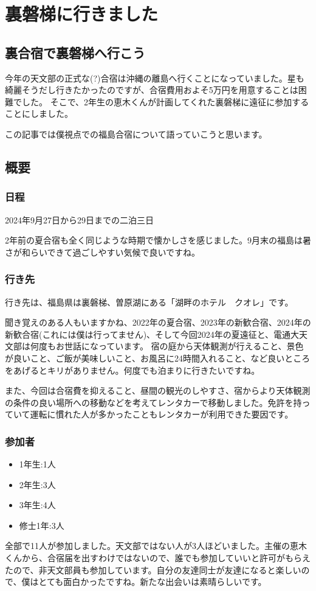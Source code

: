 \documentclass[../main]{subfiles}
\begin{document}
\chapter{裏磐梯に行きました} %

\noindent

\section{裏合宿で裏磐梯へ行こう}
今年の天文部の正式な(?)合宿は沖縄の離島へ行くことになっていました。星も綺麗そうだし行きたかったのですが、合宿費用およそ5万円を用意することは困難でした。
そこで、2年生の恵木くんが計画してくれた裏磐梯に遠征に参加することにしました。

この記事では僕視点での福島合宿について語っていこうと思います。

\section{概要}
\subsection{日程}
2024年9月27日から29日までの二泊三日

2年前の夏合宿も全く同じような時期で懐かしさを感じました。9月末の福島は暑さが和らいできて過ごしやすい気候で良いですね。
\subsection{行き先}
行き先は、福島県は裏磐梯、曽原湖にある「湖畔のホテル　クオレ」です。


聞き覚えのある人もいますかね、2022年の夏合宿、2023年の新歓合宿、2024年の新歓合宿(これには僕は行ってません)、そして今回2024年の夏遠征と、電通大天文部は何度もお世話になっています。
宿の庭から天体観測が行えること、景色が良いこと、ご飯が美味しいこと、お風呂に24時間入れること、など良いところをあげるとキリがありません。何度でも泊まりに行きたいですね。

また、今回は合宿費を抑えること、昼間の観光のしやすさ、宿からより天体観測の条件の良い場所への移動などを考えてレンタカーで移動しました。免許を持っていて運転に慣れた人が多かったこともレンタカーが利用できた要因です。


\subsection{参加者}
\begin{itemize}
\item 1年生:1人
\item 2年生:3人
\item 3年生:4人
\item 修士1年:3人
\end{itemize}
全部で11人が参加しました。天文部ではない人が3人ほどいました。主催の恵木くんから、合宿届を出すわけではないので、誰でも参加していいと許可がもらえたので、非天文部員も参加しています。自分の友達同士が友達になると楽しいので、僕はとても面白かったですね。新たな出会いは素晴らしいです。
\end{document}
